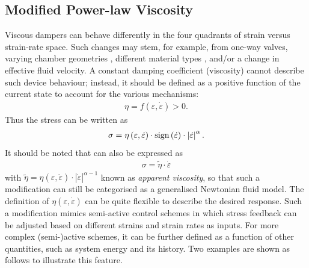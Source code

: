 \subsection{Modified Power-law Viscosity}
Viscous dampers can behave differently in the four quadrants of strain versus strain-rate space.
Such changes may stem, for example, from one-way valves, varying chamber geometries \cite{Hazaveh2017}, different material types \cite{Lu2018}, and/or a change in effective fluid velocity.
A constant damping coefficient (viscosity) cannot describe such device behaviour; instead, it should be defined as a positive function of the current state to account for the various mechanisms:
\begin{gather}
\eta=f\left(\varepsilon,\dot\varepsilon\right)>0.
\end{gather}
Thus the stress can be written as
\begin{gather}\label{eq:quadrant_damper_govern}
\sigma=\eta\left(\varepsilon,\dot\varepsilon\right)\cdot\text{sign}\left(\dot{\varepsilon}\right)\cdot\left\lvert\dot{\varepsilon}\right\rvert^{\alpha}.
\end{gather}
It should be noted that  can also be expressed as
\begin{gather}
\sigma=\tilde{\eta}\cdot\dot{\varepsilon}
\end{gather}
with $\tilde{\eta}=\eta\left(\varepsilon,\dot\varepsilon\right)\cdot\left\lvert\dot{\varepsilon}\right\rvert^{\alpha-1}$ known as \textit{apparent viscosity}, so that such a modification can still be categorised as a generalised Newtonian fluid model.
The definition of $\eta\left(\varepsilon,\dot\varepsilon\right)$ can be quite flexible to describe the desired response.
Such a modification mimics semi-active control schemes in which stress feedback can be adjusted based on different strains and strain rates as inputs.
For more complex (semi-)active schemes, it can be further defined as a function of other quantities, such as system energy and its history.
Two examples are shown as follows to illustrate this feature.
